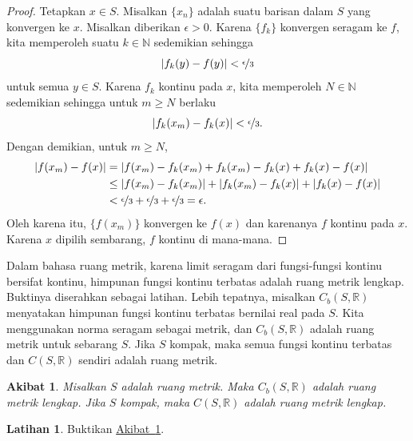 \documentclass[12pt,openany]{book}
\newcommand{\abs}[1]{\left\lvert {#1} \right\rvert}
\newcommand{\R}{{\mathbb{R}}}
\newcommand{\N}{{\mathbb{N}}}
\theoremstyle{plain}
\newtheorem{cor}[thm]{Akibat}
\theoremstyle{remark}
\theoremstyle{definition}
\newenvironment{exbox}{%
    \def\FrameCommand{\vrule width 1pt \relax\hspace{10pt}}%
    \MakeFramed{\advance\hsize-\width\FrameRestore}%
}{%
    \endMakeFramed
}
\theoremstyle{exercise}
\newtheorem{exercise}{Latihan}[section]
\theoremstyle{example}
\newcommand{\corref}[1]{\hyperref[#1]{Akibat~\ref*{#1}}}
\begin{document}
\begin{proof}
Tetapkan $x \in S$.  Misalkan $\{ x_n \}$ adalah suatu barisan dalam $S$
yang konvergen ke $x$.
Misalkan diberikan $\epsilon > 0$.
Karena $\{ f_k \}$ konvergen seragam ke $f$, kita memperoleh suatu $k \in \N$ sedemikian sehingga
\begin{equation*}
\abs{f_k(y)-f(y)} < \nicefrac{\epsilon}{3}
\end{equation*}
untuk semua $y \in S$.  Karena $f_k$ kontinu pada $x$,
kita memperoleh $N \in \N$ sedemikian sehingga untuk $m \geq N$
berlaku 
\begin{equation*}
\abs{f_k(x_m)-f_k(x)} < \nicefrac{\epsilon}{3} .
\end{equation*}
Dengan demikian, untuk
$m \geq N$,
\begin{equation*}
\begin{split}
\abs{f(x_m)-f(x)}
& =
\abs{f(x_m)-f_k(x_m)+f_k(x_m)-f_k(x)+f_k(x)-f(x)}
\\
& \leq
\abs{f(x_m)-f_k(x_m)}+
\abs{f_k(x_m)-f_k(x)}+
\abs{f_k(x)-f(x)}
\\
& <
\nicefrac{\epsilon}{3} +
\nicefrac{\epsilon}{3} +
\nicefrac{\epsilon}{3} = \epsilon .
\end{split}
\end{equation*}
Oleh karena itu, $\{ f(x_m) \}$ konvergen ke $f(x)$ dan karenanya $f$ kontinu pada
$x$.  Karena $x$ dipilih sembarang, $f$ kontinu di mana-mana.
\end{proof}

Dalam bahasa ruang metrik,
karena limit seragam dari fungsi-fungsi kontinu bersifat kontinu,
himpunan fungsi kontinu terbatas adalah ruang metrik lengkap.
Buktinya diserahkan sebagai latihan.
Lebih tepatnya,
misalkan $C_b(S,\R)$ menyatakan himpunan fungsi kontinu terbatas bernilai real pada $S$.
Kita menggunakan norma seragam sebagai metrik, dan $C_b(S,\R)$ adalah ruang metrik
untuk sebarang $S$.  Jika $S$ kompak, maka semua fungsi kontinu terbatas
dan $C(S,\R)$ sendiri adalah ruang metrik.

\begin{cor} \label{cor:CSRcomplete}
Misalkan $S$ adalah ruang metrik.  Maka $C_b(S,\R)$ adalah ruang metrik lengkap.
Jika $S$ kompak, maka $C(S,\R)$ adalah ruang metrik lengkap.
\end{cor}

\begin{exbox}
\begin{exercise}%
Buktikan \corref{cor:CSRcomplete}.
\end{exercise}
\end{exbox}
\end{document}
